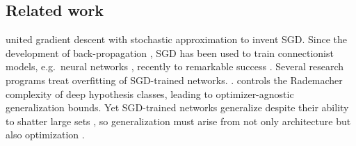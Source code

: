        \subsection{Related work}\label{sect:related}
    

            \citet{ki52} united gradient descent \citep{ca47} with stochastic
            approximation \citep{ro51} to invent SGD.  Since the development of
            back-propagation \citep{we74}, SGD
            has been used to train connectionist models, e.g.\ neural networks
            \citep{bo91}, recently to remarkable success \citep{le15}.
            Several research programs treat overfitting of SGD-trained
            networks.  \citep{ne17a}.  \citet{ba17} controls the Rademacher
            complexity of deep hypothesis classes, leading to
            optimizer-agnostic generalization bounds.  Yet SGD-trained networks
            generalize despite their ability to shatter large sets
            \citep{zh17}, so generalization must arise from not only
            architecture but also optimization%
            \citep{ne17b}.  

